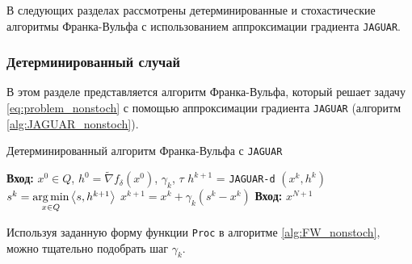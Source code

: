     В следующих разделах рассмотрены детерминированные и стохастические алгоритмы Франка-Вульфа с использованием аппроксимации градиента \texttt{JAGUAR}.

\subsubsection{Детерминированный случай} \label{section:FW_nonstoch}

    В этом разделе представляется алгоритм Франка-Вульфа, который решает задачу \eqref{eq:problem_nonstoch} с помощью аппроксимации градиента \texttt{JAGUAR} (алгоритм \ref{alg:JAGUAR_nonstoch}).

    \begin{algorithm}[H]
        \caption{Детерминированный алгоритм Франка-Вульфа с \texttt{JAGUAR}} \label{alg:FW_nonstoch}
        \begin{algorithmic}[1]
        	\State \textbf{Вход:} $x^0 \in Q$, $h^0 = \widetilde{\nabla} f_\delta (x^0)$, $\gamma_k$, $\tau$
                \State $h^{k + 1}$ = \texttt{JAGUAR-d} $\left( x^k, h^k \right)$
                \State $s^k = \operatorname*{arg\,min}\limits_{x \in Q} \left< s, h^{k + 1} \right>$
                \State $x^{k + 1} = x^k + \gamma_k (s^k - x^k)$
            \EndFor
            \State \textbf{Вход:} $x^{N + 1}$
        \end{algorithmic}
    \end{algorithm}

    Используя заданную форму функции \texttt{Proc} в алгоритме \ref{alg:FW_nonstoch}, можно тщательно подобрать шаг $\gamma_k$.

